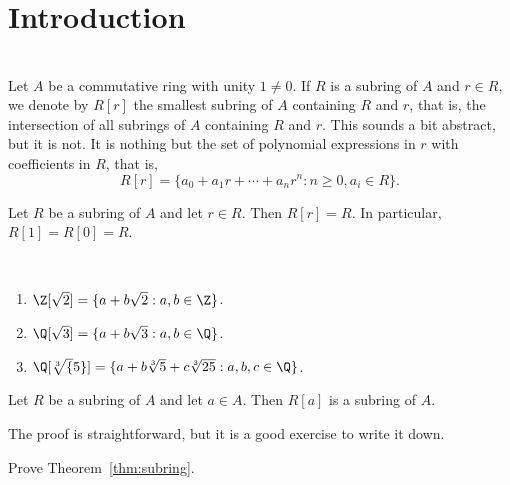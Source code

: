 \documentclass[12pt]{amsproc}
\title{\course}
\author{Leandro Vendramin}
\date{}
\begin{document}
\begin{abstract}
\end{abstract}

\maketitle

\tableofcontents

\section{Introduction}

\section{}

Let $A$ be a commutative ring with unity $1\ne 0$. If $R$ is a subring 
of $A$ and $r\in R$, we denote by $R[r]$ the smallest subring 
of $A$ containing $R$ and $r$, that is, the intersection of all subrings of $A$ containing $R$ and $r$.
This sounds a bit abstract, but it is not. It is nothing but
the set of polynomial expressions 
in $r$ with coefficients in $R$, that is,
\[
R[r] = \{ a_0 + a_1 r + \cdots + a_n r^n : n\ge 0, a_i\in R \}.
\]

\begin{example}
Let $R$ be a subring of $A$ and let $r\in R$. Then $R[r]=R$. In particular, 
$R[1]=R[0]=R$.
\end{example}

\begin{example}\
    \begin{enumerate}
        \item $\Z[\sqrt{2}]=\{ a + b \sqrt{2} : a,b\in \Z \}$.
        \item $\Q[\sqrt{3}]=\{ a + b \sqrt{3} : a,b\in \Q \}$.
        \item $\Q[\sqrt[3]{5}]=\{ a + b \sqrt[3]{5} + c \sqrt[3]{25} : a,b,c\in \Q \}$.
    \end{enumerate}
\end{example}

\begin{theorem}
    \label{thm:subring}
    Let $R$ be a subring of $A$ and let $a\in A$. Then
    $R[a]$ is a subring of $A$.
\end{theorem}

The proof is straightforward, but it is a good exercise to write it down.

\begin{exercise}
    Prove Theorem~\ref{thm:subring}.
\end{exercise}
\end{document}
